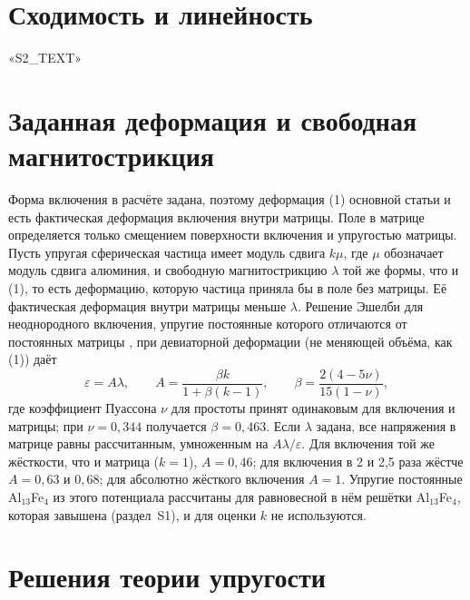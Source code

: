 \documentclass[11pt,a4paper]{article}
\begin{document}
\section{Сходимость и линейность}

«S2_TEXT»

\section{Заданная деформация и свободная магнитострикция}

Форма включения в расчёте задана, поэтому деформация
(1) основной статьи и есть фактическая деформация включения внутри матрицы.
Поле в матрице определяется только смещением поверхности включения
и упругостью матрицы. Пусть упругая сферическая частица имеет модуль сдвига
$k\mu$, где $\mu$ обозначает модуль сдвига алюминия, и свободную
магнитострикцию $\lambda$ той же формы, что и (1), то есть деформацию,
которую частица приняла бы в поле без матрицы. Её фактическая деформация
внутри матрицы меньше $\lambda$. Решение Эшелби для неоднородного включения,
упругие постоянные которого отличаются от постоянных матрицы
\cite{Eshelby1957,Mura1987}, при девиаторной деформации (не меняющей объёма,
как (1)) даёт
\begin{equation}
\varepsilon=A\lambda,\qquad A=\frac{\beta k}{1+\beta(k-1)},\qquad
\beta=\frac{2(4-5\nu)}{15(1-\nu)} ,
\end{equation}
где коэффициент Пуассона $\nu$ для простоты принят одинаковым для включения
и матрицы; при $\nu=0{,}344$ получается $\beta=0{,}463$. Если $\lambda$ задана,
все напряжения в матрице равны рассчитанным, умноженным на $A\lambda/\varepsilon$.
Для включения той же жёсткости, что и матрица ($k=1$), $A=0{,}46$; для
включения в 2 и 2{,}5 раза жёстче $A=0{,}63$ и $0{,}68$; для абсолютно
жёсткого включения $A=1$. Упругие постоянные Al$_{13}$Fe$_4$ из этого
потенциала рассчитаны для равновесной в нём решётки Al$_{13}$Fe$_4$,
которая завышена (раздел~S1), и для оценки $k$ не используются.

\section{Решения теории упругости}
\end{document}
